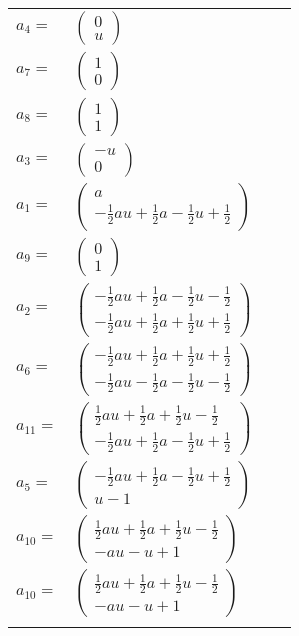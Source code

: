 \documentclass[1p]{elsarticle_modified}
\theoremstyle{definition}
\begin{document}
\begin{tabular}{m{7pt} m{180pt} m{7pt} m{180pt} }
\flushright $a_{4}=$&$\begin{pmatrix}0\\u\end{pmatrix}$ \\
\flushright $a_{7}=$&$\begin{pmatrix}1\\0\end{pmatrix}$ \\
\flushright $a_{8}=$&$\begin{pmatrix}1\\1\end{pmatrix}$ \\
\flushright $a_{3}=$&$\begin{pmatrix}- u\\0\end{pmatrix}$ \\
\flushright $a_{1}=$&$\begin{pmatrix}a\\-\frac{1}{2} a u+\frac{1}{2} a-\frac{1}{2} u+\frac{1}{2}\end{pmatrix}$ \\
\flushright $a_{9}=$&$\begin{pmatrix}0\\1\end{pmatrix}$ \\
\flushright $a_{2}=$&$\begin{pmatrix}-\frac{1}{2} a u+\frac{1}{2} a-\frac{1}{2} u-\frac{1}{2}\\-\frac{1}{2} a u+\frac{1}{2} a+\frac{1}{2} u+\frac{1}{2}\end{pmatrix}$ \\
\flushright $a_{6}=$&$\begin{pmatrix}-\frac{1}{2} a u+\frac{1}{2} a+\frac{1}{2} u+\frac{1}{2}\\-\frac{1}{2} a u-\frac{1}{2} a-\frac{1}{2} u-\frac{1}{2}\end{pmatrix}$ \\
\flushright $a_{11}=$&$\begin{pmatrix}\frac{1}{2} a u+\frac{1}{2} a+\frac{1}{2} u-\frac{1}{2}\\-\frac{1}{2} a u+\frac{1}{2} a-\frac{1}{2} u+\frac{1}{2}\end{pmatrix}$ \\
\flushright $a_{5}=$&$\begin{pmatrix}-\frac{1}{2} a u+\frac{1}{2} a-\frac{1}{2} u+\frac{1}{2}\\u-1\end{pmatrix}$ \\
\flushright $a_{10}=$&$\begin{pmatrix}\frac{1}{2} a u+\frac{1}{2} a+\frac{1}{2} u-\frac{1}{2}\\- a u- u+1\end{pmatrix}$\\ \flushright $a_{10}=$&$\begin{pmatrix}\frac{1}{2} a u+\frac{1}{2} a+\frac{1}{2} u-\frac{1}{2}\\- a u- u+1\end{pmatrix}$\\&\end{tabular}
\end{document}
